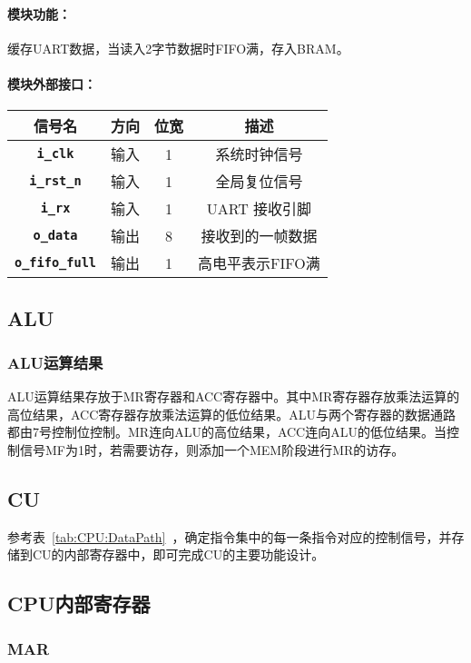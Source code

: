 \documentclass[lang=cn,a4paper,newtx]{elegantpaper}
\begin{document}
\paragraph{模块功能：}
缓存UART数据，当读入2字节数据时FIFO满，存入BRAM。
\paragraph{模块外部接口：}
\begin{longtable}{>{\bfseries}c c c c}
  \toprule
  信号名 & 方向 & 位宽 & 描述 \\
  \midrule
  \endhead
  
  \texttt{i\_clk}   & 输入  & 1      & 系统时钟信号 \\
  \texttt{i\_rst\_n} & 输入  & 1      & 全局复位信号 \\
  \texttt{i\_rx}    & 输入  & 1      & UART 接收引脚 \\
  \texttt{o\_data}  & 输出  & 8    & 接收到的一帧数据 \\
  \texttt{o\_fifo\_full} & 输出  & 1      & 高电平表示FIFO满 \\
  \bottomrule
  \end{longtable}

\subsection{ALU}
\subsubsection{ALU运算结果}
ALU运算结果存放于MR寄存器和ACC寄存器中。其中MR寄存器存放乘法运算的高位结果，ACC寄存器存放乘法运算的低位结果。ALU与两个寄存器的数据通路都由7号控制位控制。MR连向ALU的高位结果，ACC连向ALU的低位结果。当控制信号MF为1时，若需要访存，则添加一个MEM阶段进行MR的访存。

\subsection{CU}
参考表~\ref{tab:CPU:DataPath}~，确定指令集中的每一条指令对应的控制信号，并存储到CU的内部寄存器中，即可完成CU的主要功能设计。


\subsection{CPU内部寄存器}
\subsubsection{MAR}
\end{document}
